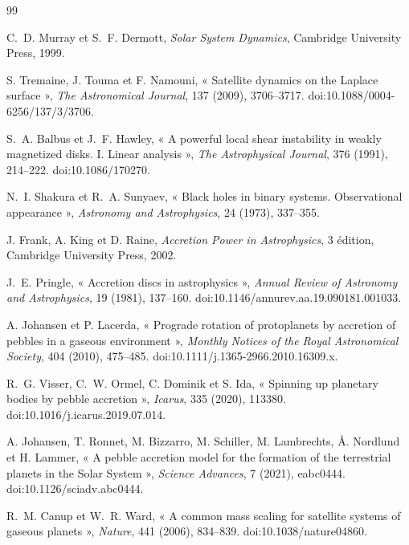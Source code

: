 \documentclass[11pt,a4paper,openany]{report}
\begin{document}
\clearpage
{}
{}
\begin{thebibliography}{99}
\small

 C.~D. Murray et S.~F. Dermott, \emph{Solar System Dynamics},
Cambridge University Press, 1999.

 S. Tremaine, J. Touma et F. Namouni, « Satellite dynamics on the
Laplace surface », \emph{The Astronomical Journal}, 137 (2009), 3706--3717.
doi:10.1088/0004-6256/137/3/3706.

 S.~A. Balbus et J.~F. Hawley, « A powerful local shear instability in
weakly magnetized disks. I. Linear analysis », \emph{The Astrophysical Journal}, 376 (1991),
214--222. doi:10.1086/170270.

 N.~I. Shakura et R.~A. Sunyaev, « Black holes in binary systems.
Observational appearance », \emph{Astronomy and Astrophysics}, 24 (1973), 337--355.

 J. Frank, A. King et D. Raine, \emph{Accretion Power in Astrophysics},
3\ieme{} édition, Cambridge University Press, 2002.

 J.~E. Pringle, « Accretion discs in astrophysics », \emph{Annual Review of
Astronomy and Astrophysics}, 19 (1981), 137--160. doi:10.1146/annurev.aa.19.090181.001033.

 A. Johansen et P. Lacerda, « Prograde rotation of protoplanets by
accretion of pebbles in a gaseous environment », \emph{Monthly Notices of the Royal Astronomical
Society}, 404 (2010), 475--485. doi:10.1111/j.1365-2966.2010.16309.x.

 R.~G. Visser, C.~W. Ormel, C. Dominik et S. Ida, « Spinning up planetary
bodies by pebble accretion », \emph{Icarus}, 335 (2020), 113380. doi:10.1016/j.icarus.2019.07.014.

 A. Johansen, T. Ronnet, M. Bizzarro, M. Schiller, M. Lambrechts,
Å. Nordlund et H. Lammer, « A pebble accretion model for the formation of the terrestrial planets
in the Solar System », \emph{Science Advances}, 7 (2021), eabc0444. doi:10.1126/sciadv.abc0444.

 R.~M. Canup et W.~R. Ward, « A common mass scaling for satellite systems
of gaseous planets », \emph{Nature}, 441 (2006), 834--839. doi:10.1038/nature04860.


\end{thebibliography}
\end{document}
